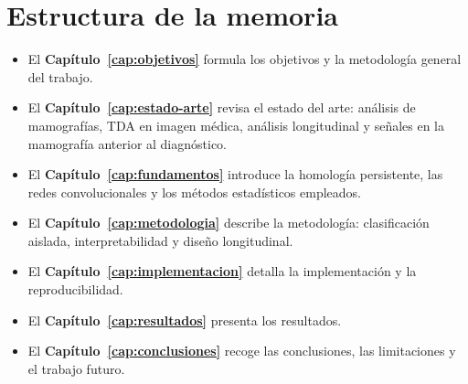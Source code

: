 \section{Estructura de la memoria}
\begin{itemize}
  \item El \textbf{Capítulo~\ref{cap:objetivos}} formula los objetivos y la
        metodología general del trabajo.
  \item El \textbf{Capítulo~\ref{cap:estado-arte}} revisa el estado del arte:
        análisis de mamografías, TDA en imagen médica, análisis longitudinal
        y señales en la mamografía anterior al diagnóstico.
  \item El \textbf{Capítulo~\ref{cap:fundamentos}} introduce la homología
        persistente, las redes convolucionales y los métodos estadísticos
        empleados.
  \item El \textbf{Capítulo~\ref{cap:metodologia}} describe la metodología:
        clasificación aislada, interpretabilidad y diseño longitudinal.
  \item El \textbf{Capítulo~\ref{cap:implementacion}} detalla la
        implementación y la reproducibilidad.
  \item El \textbf{Capítulo~\ref{cap:resultados}} presenta los resultados.
  \item El \textbf{Capítulo~\ref{cap:conclusiones}} recoge las conclusiones,
        las limitaciones y el trabajo futuro.
\end{itemize}
